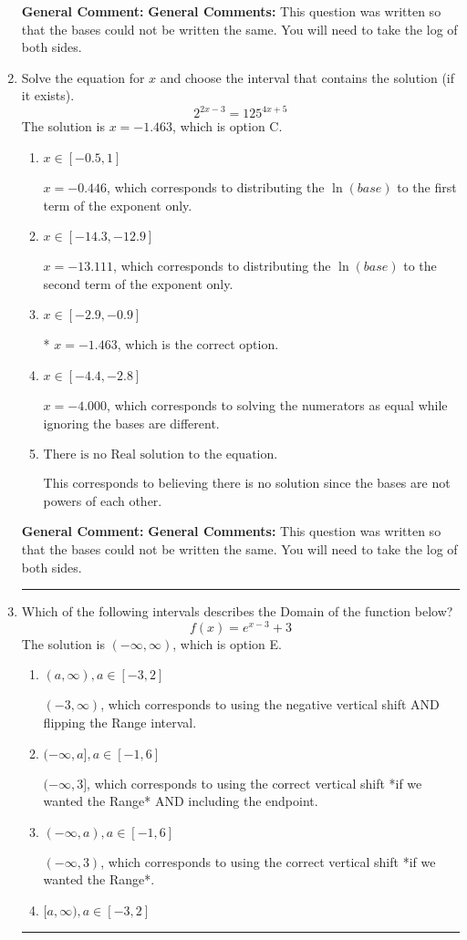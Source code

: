 \documentclass{extbook}[14pt]
\newcommand{\litem}[1]{\item #1

\rule{\textwidth}{0.4pt}}
\begin{document}
\begin{enumerate}
{\textbf{General Comment:} \textbf{General Comments:} This question was written so that the bases could not be written the same. You will need to take the log of both sides.
}
\litem{
Solve the equation for $x$ and choose the interval that contains the solution (if it exists).
\[ 2^{2x-3} = 125^{4x+5} \]The solution is \( x = -1.463 \), which is option C.\begin{enumerate}[label=\Alph*.]
\item \( x \in [-0.5, 1] \)

$x = -0.446$, which corresponds to distributing the $\ln(base)$ to the first term of the exponent only.
\item \( x \in [-14.3, -12.9] \)

$x = -13.111$, which corresponds to distributing the $\ln(base)$ to the second term of the exponent only.
\item \( x \in [-2.9, -0.9] \)

* $x = -1.463$, which is the correct option.
\item \( x \in [-4.4, -2.8] \)

$x = -4.000$, which corresponds to solving the numerators as equal while ignoring the bases are different.
\item \( \text{There is no Real solution to the equation.} \)

This corresponds to believing there is no solution since the bases are not powers of each other.
\end{enumerate}

\textbf{General Comment:} \textbf{General Comments:} This question was written so that the bases could not be written the same. You will need to take the log of both sides.
}
\litem{
Which of the following intervals describes the Domain of the function below?
\[ f(x) = e^{x-3}+3 \]The solution is \( (-\infty, \infty) \), which is option E.\begin{enumerate}[label=\Alph*.]
\item \( (a, \infty), a \in [-3, 2] \)

$(-3, \infty)$, which corresponds to using the negative vertical shift AND flipping the Range interval.
\item \( (-\infty, a], a \in [-1, 6] \)

$(-\infty, 3]$, which corresponds to using the correct vertical shift *if we wanted the Range* AND including the endpoint.
\item \( (-\infty, a), a \in [-1, 6] \)

$(-\infty, 3)$, which corresponds to using the correct vertical shift *if we wanted the Range*.
\item \( [a, \infty), a \in [-3, 2] \)


\end{enumerate}}
\end{enumerate}
\end{document}

